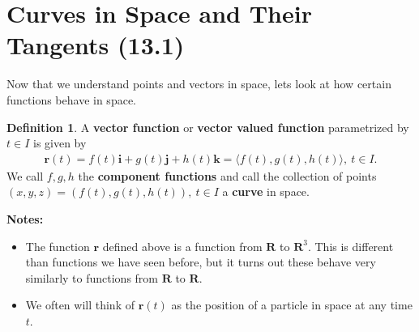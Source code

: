 \documentclass[12pt, letter]{article}
\theoremstyle{plain}
\numberwithin{theorem}{section}
\theoremstyle{definition}
\newtheorem{definition}[theorem]{Definition}
\begin{document}

\section{Curves in Space and Their Tangents (13.1)}

Now that we understand points and vectors in space, lets look at how certain functions behave in space.

\bigskip

\begin{definition}
A \textbf{vector function} or \textbf{vector valued function} parametrized by $t\in I$ is given by
\begin{align*}
\bm{r}(t) = f(t) \bm{i} + g(t)\bm{j} + h(t)\bm{k} = \langle f(t), g(t), h(t) \rangle, \ t\in I.
\end{align*}
We call $f,g,h$ the \textbf{component functions} and call the collection of points $(x,y,z) = (f(t),g(t),h(t)), \ t\in I$ a \textbf{curve} in space.
\end{definition}

\bigskip

\textbf{Notes:}
\begin{itemize}
\item The function $\bm{r}$ defined above is a function from $\bm{R}$ to $\bm{R}^3$. This is different than functions we have seen before, but it turns out these behave very similarly to functions from $\bm{R}$ to $\bm{R}$.
\item We often will think of $\bm{r}(t)$ as the position of a particle in space at any time $t$.
\end{itemize}

\bigskip

\hrulefill

\bigskip
\end{document}
